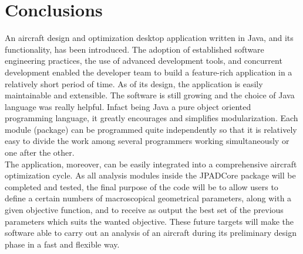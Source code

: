 \chapter*{Conclusions}
An aircraft design and optimization desktop application written in Java, and its functionality, has been introduced. The adoption of established software engineering practices, the use of advanced development tools, and concurrent development enabled the developer team to build a feature-rich application in a relatively short period of time. As of its design, the application is easily maintainable and extensible. The software is still growing and the choice of Java language was really helpful. Infact being Java a pure object oriented programming language, it greatly encourages and simplifies modularization. Each module (package) can be programmed quite independently so that it is relatively easy to divide the work among several programmers working simultaneously or one after the other.\\
The application, moreover, can be easily integrated into a comprehensive aircraft optimization cycle. As all analysis modules inside the JPADCore package will be completed and tested, the final purpose of the code will be to allow users to define a certain numbers of macroscopical geometrical parameters, along with a given objective function, and to receive as output the best set of the previous parameters which suits the wanted objective. These future targets will make the software able to carry out an analysis of an aircraft during its preliminary design phase in a fast and flexible way.